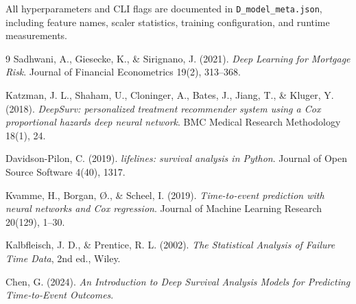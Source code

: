 \documentclass[11pt,a4paper]{article}
\begin{document}
All hyperparameters and CLI flags are documented in \texttt{D\_model\_meta.json}, including feature names, scaler statistics, training configuration, and runtime measurements.

\begin{thebibliography}{9}
  \small
  Sadhwani, A., Giesecke, K., \& Sirignano, J. (2021).
  \textit{Deep Learning for Mortgage Risk}. Journal of Financial Econometrics 19(2), 313--368.

  Katzman, J. L., Shaham, U., Cloninger, A., Bates, J., Jiang, T., \& Kluger, Y. (2018).
  \textit{DeepSurv: personalized treatment recommender system using a Cox proportional hazards deep neural network}. BMC Medical Research Methodology 18(1), 24.

  Davidson-Pilon, C. (2019).
  \textit{lifelines: survival analysis in Python}. Journal of Open Source Software 4(40), 1317.

  Kvamme, H., Borgan, {\O}., \& Scheel, I. (2019).
  \textit{Time-to-event prediction with neural networks and Cox regression}. Journal of Machine Learning Research 20(129), 1--30.

  Kalbfleisch, J. D., \& Prentice, R. L. (2002).
  \textit{The Statistical Analysis of Failure Time Data}, 2nd ed., Wiley.

  Chen, G. (2024).
  \textit{An Introduction to Deep Survival Analysis Models for Predicting Time-to-Event Outcomes}.
\end{thebibliography}
\end{document}
